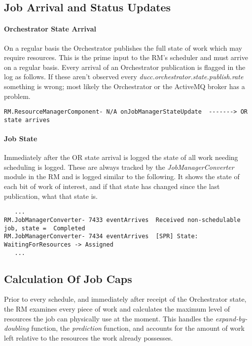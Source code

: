 \subsection{Job Arrival and Status Updates}
 
   \paragraph{Orchestrator State Arrival}

     On a regular basis the Orchestrator publishes the full state of
     work which may require resources.  This is the prime input to the
     RM's scheduler and must arrive on a regular basis.  Every arrival
     of an Orchestrator publication is flagged in the log as follows.
     If these aren't observed every
     {\em ducc.orchestrator.state.publish.rate}
     something is wrong; most likely the Orchestrator or
     the ActiveMQ broker has a problem.

\begin{verbatim}
RM.ResourceManagerComponent- N/A onJobManagerStateUpdate  -------> OR state arrives
\end{verbatim}
        
    \paragraph{Job State}
    Immediately after the OR state arrival is logged the state of all work needing scheduling
    is logged.  These are always tracked by the {\em JobManagerConverter} module in the
    RM and is logged similar to the following.  It shows the state of each bit of work
    of interest, and if that state has changed since the last publication, what that state is.
\begin{verbatim}
   ...
RM.JobManagerConverter- 7433 eventArrives  Received non-schedulable job, state =  Completed
RM.JobManagerConverter- 7434 eventArrives  [SPR] State:  WaitingForResources -> Assigned
   ...
\end{verbatim}

\subsection{Calculation Of Job Caps}
   Prior to every schedule, and immediately after receipt of the Orchestrator state,
   the RM examines every piece of work and calculates the maximum level of resources the
   job can physically use at the moment.  This handles the {\em expand-by-doubling} 
   function, the {\em prediction} function, and accounts for the amount of work left
   relative to the resources the work already possesses.

